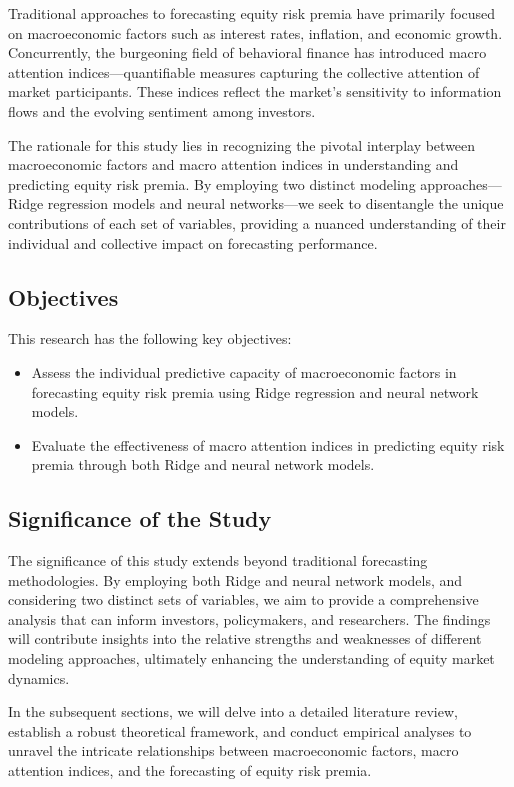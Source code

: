 \documentclass{article}
\begin{document}
Traditional approaches to forecasting equity risk premia have primarily focused on macroeconomic factors such as interest rates, inflation, and economic growth. Concurrently, the burgeoning field of behavioral finance has introduced macro attention indices—quantifiable measures capturing the collective attention of market participants. These indices reflect the market's sensitivity to information flows and the evolving sentiment among investors.

The rationale for this study lies in recognizing the pivotal interplay between macroeconomic factors and macro attention indices in understanding and predicting equity risk premia. By employing two distinct modeling approaches—Ridge regression models and neural networks—we seek to disentangle the unique contributions of each set of variables, providing a nuanced understanding of their individual and collective impact on forecasting performance.

\subsection{Objectives}

This research has the following key objectives:
\begin{itemize}
  \item Assess the individual predictive capacity of macroeconomic factors in forecasting equity risk premia using Ridge regression and neural network models.
  \item Evaluate the effectiveness of macro attention indices in predicting equity risk premia through both Ridge and neural network models.
\end{itemize}

\subsection{Significance of the Study}

The significance of this study extends beyond traditional forecasting methodologies. By employing both Ridge and neural network models, and considering two distinct sets of variables, we aim to provide a comprehensive analysis that can inform investors, policymakers, and researchers. The findings will contribute insights into the relative strengths and weaknesses of different modeling approaches, ultimately enhancing the understanding of equity market dynamics.

In the subsequent sections, we will delve into a detailed literature review, establish a robust theoretical framework, and conduct empirical analyses to unravel the intricate relationships between macroeconomic factors, macro attention indices, and the forecasting of equity risk premia.
\end{document}
